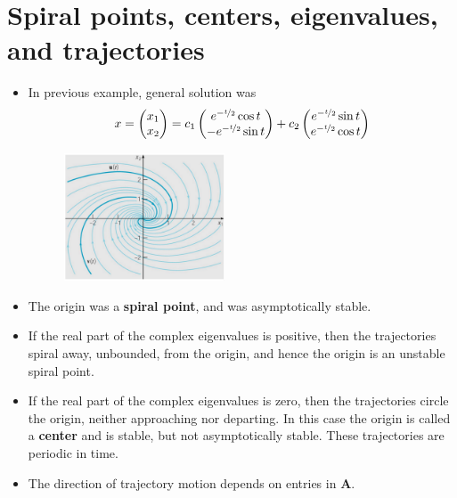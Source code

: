 \documentclass[11pt,a4paper]{article}
\begin{document}
	\section*{Spiral points, centers, eigenvalues, and trajectories}
	\begin{itemize}
		\item In previous example, general solution was
		$$
		x =
		\begin{pmatrix}
			x_1\\
			x_2
		\end{pmatrix} = c_1
		\begin{pmatrix}
			e^{-\nicefrac{t}{2}}\cos t\\
			-e^{-\nicefrac{t}{2}}\sin t
		\end{pmatrix} + c_2
		\begin{pmatrix}
			e^{-\nicefrac{t}{2}}\sin t\\
			e^{-\nicefrac{t}{2}}\cos t
		\end{pmatrix}
		$$
		\begin{figure}[H]
			\centering
				\includegraphics[width=0.45\textwidth]{figure/Lec13f2.PNG}
		\end{figure}
		\item The origin was a \textbf{spiral point}, and was asymptotically stable.
		\item If the real part of the complex eigenvalues is positive, then the trajectories spiral away, unbounded, from the origin, and hence the origin is an unstable spiral point.
		\item If the real part of the complex eigenvalues is zero, then the trajectories circle the origin, neither approaching nor departing. In this case the origin is called a \textbf{center} and is stable, but not asymptotically stable. These trajectories are periodic in time.
		\item The direction of trajectory motion depends on entries in \textbf{A}.
	\end{itemize}
\end{document}
